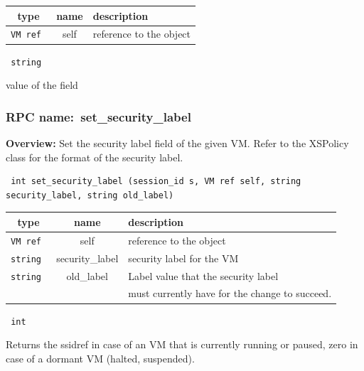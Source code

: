 \vspace{0.3cm}
\begin{tabular}{|c|c|p{7cm}|}
 \hline
{\bf type} & {\bf name} & {\bf description} \\ \hline
{\tt VM ref } & self & reference to the object \\ \hline

\end{tabular}

\vspace{0.3cm}

{\tt
string
}


value of the field
\vspace{0.3cm}
\vspace{0.3cm}
\vspace{0.3cm}
\subsubsection{RPC name:~set\_security\_label}

{\bf Overview:}
Set the security label field of the given VM. Refer to the XSPolicy class
for the format of the security label.

\begin{verbatim} int set_security_label (session_id s, VM ref self, string
security_label, string old_label)\end{verbatim}




\vspace{0.3cm}
\begin{tabular}{|c|c|p{7cm}|}
 \hline
{\bf type} & {\bf name} & {\bf description} \\ \hline
{\tt VM ref } & self & reference to the object \\ \hline
{\tt string } & security\_label & security label for the VM \\ \hline
{\tt string } & old\_label & Label value that the security label \\
& & must currently have for the change to succeed.\\ \hline

\end{tabular}

\vspace{0.3cm}

{\tt
int
}


Returns the ssidref in case of an VM that is currently running or
paused, zero in case of a dormant VM (halted, suspended).

